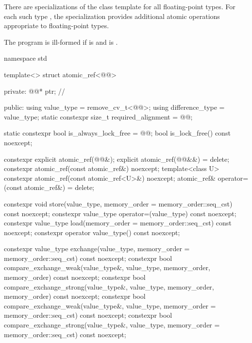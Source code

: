 \pnum
{}%
There are specializations of the  class template
for all floating-point types.
For each such type ,
the specialization  provides
additional atomic operations appropriate to floating-point types.

\pnum
The program is ill-formed
if  is  and
 is .

\begin{codeblock}
namespace std {
  template<> struct atomic_ref<@@> {
  private:
    @@* ptr;   // \expos

  public:
    using value_type = remove_cv_t<@@>;
    using difference_type = value_type;
    static constexpr size_t required_alignment = @@;

    static constexpr bool is_always_lock_free = @@;
    bool is_lock_free() const noexcept;

    constexpr explicit atomic_ref(@@&);
    explicit atomic_ref(@@&&) = delete;
    constexpr atomic_ref(const atomic_ref&) noexcept;
    template<class U>
      constexpr atomic_ref(const atomic_ref<U>&) noexcept;
    atomic_ref& operator=(const atomic_ref&) = delete;

    constexpr void store(value_type,
                         memory_order = memory_order::seq_cst) const noexcept;
    constexpr value_type operator=(value_type) const noexcept;
    constexpr value_type load(memory_order = memory_order::seq_cst) const noexcept;
    constexpr operator value_type() const noexcept;

    constexpr value_type exchange(value_type,
                                  memory_order = memory_order::seq_cst) const noexcept;
    constexpr bool compare_exchange_weak(value_type&, value_type,
                                         memory_order, memory_order) const noexcept;
    constexpr bool compare_exchange_strong(value_type&, value_type,
                                           memory_order, memory_order) const noexcept;
    constexpr bool compare_exchange_weak(value_type&, value_type,
                                         memory_order = memory_order::seq_cst) const noexcept;
    constexpr bool compare_exchange_strong(value_type&, value_type,
                                           memory_order = memory_order::seq_cst) const noexcept;

}}
\end{codeblock}
